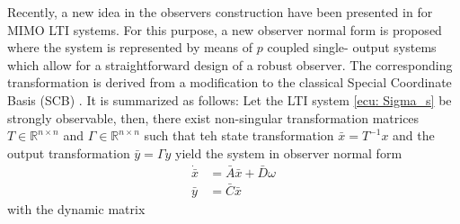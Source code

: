 \documentclass[11pt,letterpaper,twoside,openright]{report}
\begin{document}
Recently, a new idea in the observers construction have been presented in \cite{Niederwieser2021} for MIMO LTI systems. For this purpose, a new observer
normal form is proposed where the system is represented by means of $p$ coupled single-
output systems which allow for a straightforward design of a robust observer. The corresponding transformation is derived from a modification to the classical Special Coordinate Basis (SCB) \cite{Chen2004}. It is summarized as follows: Let the LTI system \eqref{ecu: Sigma_s} be strongly observable, then, there exist non-singular transformation matrices $T\in \mathbb{R}^{n\times n}$ and $\Gamma \in \mathbb{R}^{n\times n}$ such that teh state transformation $\bar{x}=T^{-1}x$ and the output transformation $\bar{y}=\Gamma y$ yield the system in observer normal form 
\begin{equation}\label{ecu: Niederwieser SCB}
\begin{split}
\dot{\bar{x}} &= \bar{A}\bar{x}+\bar{D}\omega\\
\bar{y} &= \bar{C}\bar{x}
\end{split}
\end{equation}
with the dynamic matrix
\end{document}
